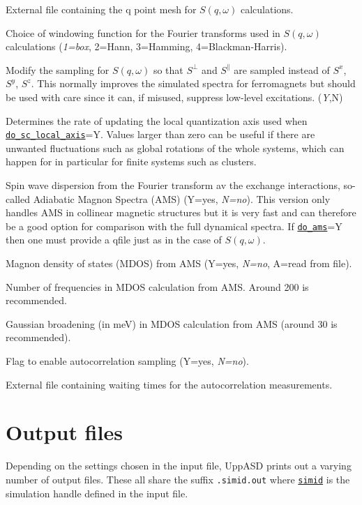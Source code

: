 \documentclass[11pt,fleqn,a4]{book} %
\makeatletter
\newcommand{\litem}[1]{\item[\bfseries#1\index{#1@\texttt{#1}}\label{#1}]}
\newcommand{\rkeyword}[1]{\hyperref[#1]{\texttt{#1}}}
\makeatother
\begin{document}
\begin{description}[leftmargin=!,labelwidth=\widthof{\bfseries fifteenchars}]
\litem{qfile} External file containing the q point mesh for $S(q,\omega)$ calculations. 
\litem{sc_window_fun} Choice of windowing function for the Fourier transforms used in $S(q,\omega)$  calculations (\emph{1=box}, 2=Hann, 3=Hamming, 4=Blackman-Harris).
\litem{do_sc_local_axis} Modify the sampling for $S(q,\omega)$ so that $S^\bot$ and $S^\parallel$ are sampled instead of $S^x$, $S^y$, $S^z$. This normally improves the simulated spectra for ferromagnets but should be used with care since it can, if misused, suppress low-level excitations. (\emph{Y},N)
\litem{sc_local_axis_mix} Determines the rate of updating the local quantization axis used when \rkeyword{do_sc_local_axis}=Y. Values larger than zero can be useful if there are unwanted fluctuations such as global rotations of the whole systems, which can happen for in particular for finite systems such as clusters.

\litem{do_ams} Spin wave dispersion from the Fourier transform av the exchange interactions, so-called Adiabatic Magnon Spectra (AMS) (Y=yes, \emph{N=no}). This version only handles AMS in collinear magnetic structures but it is very fast and can therefore be a good option for comparison with the full dynamical spectra. If \rkeyword{do_ams}=Y then one must provide a qfile just as in the case of $S(q,\omega)$.
\litem{do_magdos} Magnon density of states (MDOS) from AMS (Y=yes, \emph{N=no}, A=read from file).  
\litem{magdos_freq} Number of frequencies in MDOS calculation from AMS. Around 200 is recommended.
\litem{magdos_sigma} Gaussian broadening (in meV) in MDOS calculation from AMS (around 30 is recommended).




\litem{do_autocorr} Flag to enable autocorrelation sampling (Y=yes, \emph{N=no}).
\litem{acfile} External file containing waiting times for the autocorrelation measurements.
\end{description}






\section{Output files}

Depending on the settings chosen in the input file, UppASD prints out a varying number of output files. These all share the suffix \texttt{.simid.out} where \rkeyword{simid} is the simulation handle defined in the input file.
\end{document}
